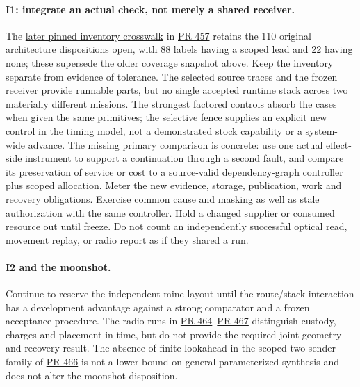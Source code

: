 \documentclass[11pt]{article}
\newcommand{\pr}[1]{\href{https://github.com/eternal-november/eos-research-programmes/pull/#1}{PR #1}}
\begin{document}
\paragraph{I1: integrate an actual check, not merely a shared receiver.}
The \href{https://github.com/eternal-november/eos-research-programmes/blob/48f5a21ae7b904ecefbbdd1f2b4e31d26caaa31a/projects/swarm-coordination/fault-inventory/evaluation/README.md}{later pinned inventory crosswalk} in \pr{457} retains the 110 original architecture dispositions open, with 88 labels having a scoped lead and 22 having none; these supersede the older coverage snapshot above. Keep the inventory separate from evidence of tolerance. The selected source traces and the frozen receiver provide runnable parts, but no single accepted runtime stack across two materially different missions. The strongest factored controls absorb the cases when given the same primitives; the selective fence supplies an explicit new control in the timing model, not a demonstrated stock capability or a system-wide advance. The missing primary comparison is concrete: use one actual effect-side instrument to support a continuation through a second fault, and compare its preservation of service or cost to a source-valid dependency-graph controller plus scoped allocation. Meter the new evidence, storage, publication, work and recovery obligations. Exercise common cause and masking as well as stale authorization with the same controller. Hold a changed supplier or consumed resource out until freeze. Do not count an independently successful optical read, movement replay, or radio report as if they shared a run.

\paragraph{I2 and the moonshot.}
Continue to reserve the independent mine layout until the route/stack interaction has a development advantage against a strong comparator and a frozen acceptance procedure. The radio runs in \pr{464}--\pr{467} distinguish custody, charges and placement in time, but do not provide the required joint geometry and recovery result. The absence of finite lookahead in the scoped two-sender family of \pr{466} is not a lower bound on general parameterized synthesis and does not alter the moonshot disposition.
\end{document}

